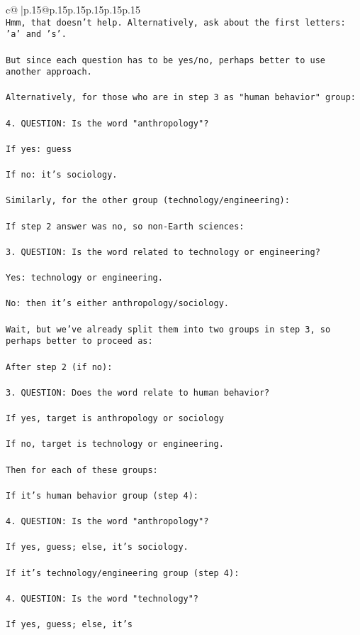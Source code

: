 \documentclass{article}
\begin{document}
{\begin{supertabular}{c@{$\;$}|p{.15\linewidth}@{}p{.15\linewidth}p{.15\linewidth}p{.15\linewidth}p{.15\linewidth}p{.15\linewidth}}
{{{\tt \\ \tt Hmm, that doesn't help. Alternatively, ask about the first letters: 'a' and 's'.\\ \tt \\ \tt But since each question has to be yes/no, perhaps better to use another approach.\\ \tt \\ \tt Alternatively, for those who are in step 3 as "human behavior" group:\\ \tt \\ \tt 4. QUESTION: Is the word "anthropology"?\\ \tt \\ \tt If yes: guess\\ \tt \\ \tt If no: it's sociology.\\ \tt \\ \tt Similarly, for the other group (technology/engineering):\\ \tt \\ \tt If step 2 answer was no, so non-Earth sciences:\\ \tt \\ \tt 3. QUESTION: Is the word related to technology or engineering?\\ \tt \\ \tt Yes: technology or engineering.\\ \tt \\ \tt No: then it's either anthropology/sociology.\\ \tt \\ \tt Wait, but we've already split them into two groups in step 3, so perhaps better to proceed as:\\ \tt \\ \tt After step 2 (if no):\\ \tt \\ \tt 3. QUESTION: Does the word relate to human behavior?\\ \tt \\ \tt If yes, target is anthropology or sociology\\ \tt \\ \tt If no, target is technology or engineering.\\ \tt \\ \tt Then for each of these groups:\\ \tt \\ \tt If it's human behavior group (step 4):\\ \tt \\ \tt 4. QUESTION: Is the word "anthropology"?\\ \tt \\ \tt If yes, guess; else, it's sociology.\\ \tt \\ \tt If it's technology/engineering group (step 4):\\ \tt \\ \tt 4. QUESTION: Is the word "technology"?\\ \tt \\ \tt If yes, guess; else, it's }}}
\end{supertabular}}
\end{document}
